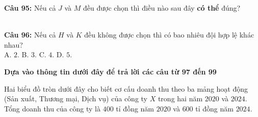 \documentclass[12pt,a4paper]{article}
\begin{document}


\vspace{0.3cm}

\noindent \textbf{Câu 95:} Nếu cả $J$ và $M$ đều được chọn thì điều nào sau đây \textbf{có thể} đúng?\\
\noindent{}\\
\noindent{}



\vspace{0.3cm}

\noindent \textbf{Câu 96:} Nếu cả $H$ và $K$ đều không được chọn thì có bao nhiêu đội hợp lệ khác nhau?\\
\noindent A. $2$. \hfill B. $3$. \hfill C. $4$. \hfill D. $5$.



\vspace{0.5cm}
\noindent\textbf{Dựa vào thông tin dưới đây để trả lời các câu từ 97 đến 99}%


\par\nobreak

Hai biểu đồ tròn dưới đây cho biết cơ cấu doanh thu theo ba mảng hoạt động (Sản xuất, Thương mại, Dịch vụ) của công ty $X$ trong hai năm $2020$ và $2024$. Tổng doanh thu của công ty là $400$ tỉ đồng năm $2020$ và $600$ tỉ đồng năm $2024$.
\end{document}
